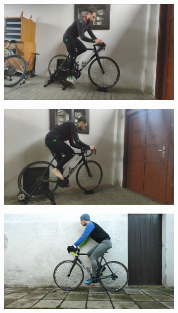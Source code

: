 \begin{figure}[htb]
\begin{subfigure}[b]{\imgwidth}
        \includegraphics[width=1\linewidth]{obrazky-figures/6.jpg}
    \end{subfigure}
    \begin{subfigure}[b]{\imgwidth}
        \centering

        \includegraphics[width=1\linewidth]{obrazky-figures/7.jpg}

    \end{subfigure}
    \hfill
    \begin{subfigure}[b]{\imgwidth}
        \centering

        \includegraphics[width=1\linewidth]{obrazky-figures/8.jpg}


\end{subfigure}
\end{figure}
